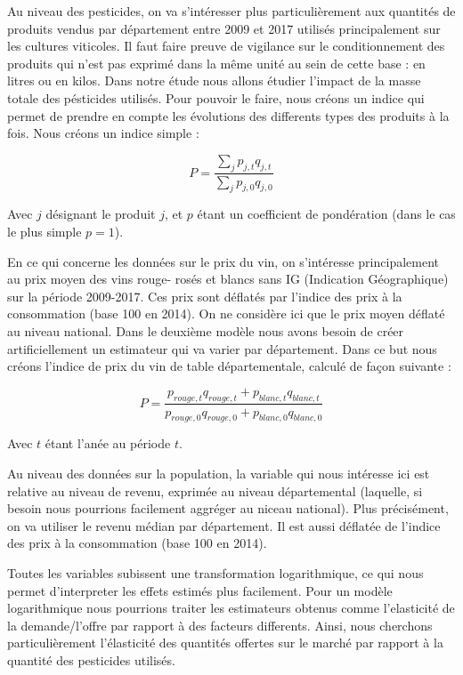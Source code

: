 \documentclass[11pt,]{article}
\begin{document}
Au niveau des pesticides, on va s'intéresser plus particulièrement aux
quantités de produits vendus par département entre 2009 et 2017 utilisés
principalement sur les cultures viticoles. Il faut faire preuve de
vigilance sur le conditionnement des produits qui n'est pas exprimé dans
la même unité au sein de cette base : en litres ou en kilos. Dans notre
étude nous allons étudier l'impact de la masse totale des pésticides
utilisés. Pour pouvoir le faire, nous créons un indice qui permet de
prendre en compte les évolutions des differents types des produits à la
fois. Nous créons un indice simple :

\begin{equation*}
  P = \frac{\sum_j p_{j, t} q_{j, t}}{\sum_j p_{j, 0} q_{j, 0}}
\end{equation*}

Avec \(j\) désignant le produit \(j\), et \(p\) étant un coefficient de
pondération (dans le cas le plus simple \(p = 1\)).

En ce qui concerne les données sur le prix du vin, on s'intéresse
principalement au prix moyen des vins rouge- rosés et blancs sans IG
(Indication Géographique) sur la période 2009-2017. Ces prix sont
déflatés par l'indice des prix à la consommation (base 100 en 2014). On
ne considère ici que le prix moyen déflaté au niveau national. Dans le
deuxième modèle nous avons besoin de créer artificiellement un
estimateur qui va varier par département. Dans ce but nous créons
l'indice de prix du vin de table départementale, calculé de façon
suivante :

\begin{equation*}
  P = \frac{p_{rouge, t} q_{rouge, t} + p_{blanc, t} q_{blanc, t}}{p_{rouge, 0} q_{rouge, 0} + p_{blanc, 0} q_{blanc, 0}}
\end{equation*}

Avec \(t\) étant l'anée au période \(t\).

Au niveau des données sur la population, la variable qui nous intéresse
ici est relative au niveau de revenu, exprimée au niveau départemental
(laquelle, si besoin nous pourrions facilement aggréger au niceau
national). Plus précisément, on va utiliser le revenu médian par
département. Il est aussi déflatée de l'indice des prix à la
consommation (base 100 en 2014).

Toutes les variables subissent une transformation logarithmique, ce qui
nous permet d'interpreter les effets estimés plus facilement. Pour un
modèle logarithmique nous pourrions traiter les estimateurs obtenus
comme l'elasticité de la demande/l'offre par rapport à des facteurs
differents. Ainsi, nous cherchons particulièrement l'élasticité des
quantités offertes sur le marché par rapport à la quantité des
pesticides utilisés.
\end{document}
